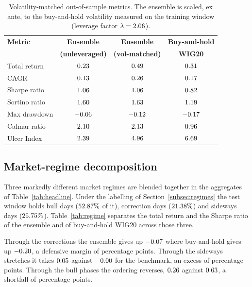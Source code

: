 \begin{table}[!htbp]
\centering
\small
\caption{Volatility-matched out-of-sample metrics. The ensemble is scaled, ex ante, to the buy-and-hold volatility measured on the training window (leverage factor $\lambda = 2.06{}$).}
\label{tab:volmatched}
\begin{tabular}{lccc}
\toprule
\textbf{Metric} & \textbf{Ensemble} & \textbf{Ensemble} & \textbf{Buy-and-hold} \\
                & \textbf{(unleveraged)} & \textbf{(vol-matched)} & \textbf{WIG20} \\
\midrule
Total return     & $0.23$     & $0.49$      & $0.31$ \\
CAGR             & $0.13$   & $0.26$    & $0.17$ \\
Sharpe ratio     & $1.06$     & $1.06$  & $0.82$ \\
Sortino ratio    & $1.60$ & $1.63$ & $1.19$ \\
Max drawdown     & $-0.06$    & $-0.12$     & $-0.17$ \\
Calmar ratio     & $2.10$   & $2.13$  & $0.96$ \\
Ulcer Index      & $2.39$   & $4.96$   & $6.69$ \\
\bottomrule
\end{tabular}
\end{table}

\subsection{Market-regime decomposition}\label{subsec:regime}

Three markedly different market regimes are blended together in the aggregates of Table~\ref{tab:headline}. Under the labelling of Section~\ref{subsec:regimes} the test window holds \RegBullDays{} bull days ($52.87\%{}$ of it), \RegCorrectionDays{} correction days ($21.38\%{}$) and \RegSidewaysDays{} sideways days ($25.75\%{}$). Table~\ref{tab:regime} separates the total return and the Sharpe ratio of the ensemble and of buy-and-hold WIG20 across those three.

Through the corrections the ensemble gives up $-0.07{}$ where buy-and-hold gives up $-0.20{}$, a defensive margin of \CorrectionDefencePP{} percentage points. Through the sideways stretches it takes $0.05{}$ against $-0.00{}$ for the benchmark, an excess of \SidewaysExcessPP{} percentage points. Through the bull phases the ordering reverses, $0.26{}$ against $0.63{}$, a shortfall of \BullShortfallPP{} percentage points.


